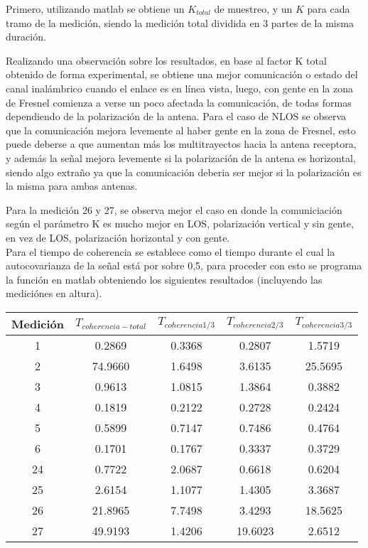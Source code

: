 \documentclass[12pt]{article}
\begin{document}
Primero, utilizando matlab se obtiene un $K_{total}$ de muestreo, y un $K$ para cada tramo
de la medición, siendo la medición total dividida en 3 partes de la misma duración. 

Realizando una observación sobre los resultados, en base al factor K total obtenido
de forma experimental, se obtiene una mejor comunicación o estado del canal inalámbrico 
cuando el enlace es en línea vista, luego, con gente en la zona de Fresnel comienza a 
verse un poco afectada la comunicación, de todas formas dependiendo de la polarización
de la antena. Para el caso de NLOS se observa que la comunicación mejora levemente al haber
gente en la zona de Fresnel, esto puede deberse a que aumentan más los multitrayectos
hacia la antena receptora, y además la señal mejora levemente si la polarización de la 
antena es horizontal, siendo algo extraño ya que la comunicación deberia ser mejor si 
la polarización es la misma para ambas antenas.

Para la medición 26 y 27, se observa mejor el caso en donde la comuniciación según el 
parámetro K es mucho mejor en LOS, polarización vertical y sin gente, en vez de 
LOS, polarización horizontal y con gente.\\

Para el tiempo de coherencia se establece como el tiempo durante el cual la autocovarianza 
de la señal está por sobre 0,5, para proceder con esto se programa la función en matlab 
obteniendo los siguientes resultados (incluyendo las mediciónes en altura).
\begin{center}
	\begin{tabular}{| c | c | c | c | c |} \hline
Medición & $T_{coherencia-total}$ & $T_{coherencia1/3}$ & $T_{coherencia2/3}$ & 
$T_{coherencia3/3}$\\ \hline
1	& 0.2869 &	0.3368 &   0.2807 &  1.5719 \\ \hline
2	& 74.9660 &	1.6498 &   3.6135 & 25.5695 \\ \hline
3	& 0.9613 &	1.0815 &   1.3864 &  0.3882 \\ \hline
4	& 0.1819 &	0.2122 &   0.2728 & 0.2424 \\ \hline
5	& 0.5899 &	0.7147 &   0.7486 &  0.4764 \\ \hline
6	& 0.1701 &	0.1767 &   0.3337 &  0.3729 \\ \hline
24	& 0.7722 & 2.0687  &  0.6618  &  0.6204	\\ \hline
25	& 2.6154 & 1.1077  &  1.4305  &  3.3687\\ \hline
26	& 21.8965 & 7.7498  &  3.4293  & 18.5625 \\ \hline
27	& 49.9193 & 1.4206 &  19.6023 &   2.6512	\\ \hline
	\end{tabular}
\end{center}
\end{document}
